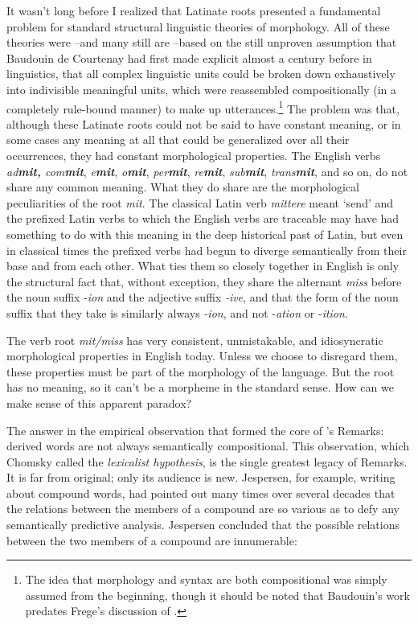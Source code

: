 \documentclass[output=paper]{langsci/langscibook}
\begin{document}
It wasn't long before I realized that Latinate roots presented a
fundamental problem for standard structural linguistic theories of
morphology. All of these theories were --and many still are --based on
the still unproven assumption that Baudouin de Courtenay had first made
explicit almost a century before in linguistics, that all complex
linguistic units could be broken down exhaustively into indivisible
meaningful units, which were reassembled compositionally (in a
completely rule-bound manner) to make up utterances.\footnote{The idea
  that morphology and syntax are both compositional was simply assumed
  from the beginning, though it should be noted that Baudouin's work
  predates Frege's discussion of .} The problem was
that, although these Latinate roots could not be said to have constant
meaning, or in some cases any meaning at all that could be generalized
over all their occurrences, they had constant morphological properties.
The English verbs \emph{ad\textbf{mit,} com\textbf{mit}},
\emph{e\textbf{mit}}, \emph{o\textbf{mit}}, \emph{per\textbf{mit}},
\emph{re\textbf{mit}}, \emph{sub\textbf{mit}}, \emph{trans\textbf{mit}},
and so on, do not share any common meaning. What they do share are the
morphological peculiarities of the root \emph{mit}. The classical Latin
verb \emph{mittere} meant `send' and the prefixed Latin verbs to which
the English verbs are traceable may have had something to do with this
meaning in the deep historical past of Latin, but even in classical
times the prefixed verbs had begun to diverge semantically from their
base and from each other. What ties them so closely together in English
is only the structural fact that, without exception, they share the
alternant \emph{miss} before the noun suffix -\emph{ion} and the
adjective suffix \emph{-ive}, and that the form of the noun suffix that
they take is similarly always \emph{-ion}, and not -\emph{ation} or
-\emph{ition}.

The verb root \emph{mit/miss} has very consistent, unmistakable, and
idiosyncratic morphological properties in English today. Unless we
choose to disregard them, these properties must be part of the
morphology of the language. But the root has no meaning, so it can't be
a morpheme in the standard sense. How can we make sense of this apparent
paradox?
 
The answer  in the empirical observation that formed the core of %
\citeauthor{Chomsky1970}%
's Remarks: derived words are not always semantically
compositional. This observation, which Chomsky called the
\emph{lexicalist hypothesis}, is the single greatest legacy of
Remarks. It is far from original; only its audience is new.
Jespersen, for example, writing about compound words, had pointed out
many times over several decades that the relations between the members
of a compound are so various as to defy any semantically predictive
analysis. Jespersen concluded that the possible relations between the
two members of a compound are innumerable:
\end{document}
